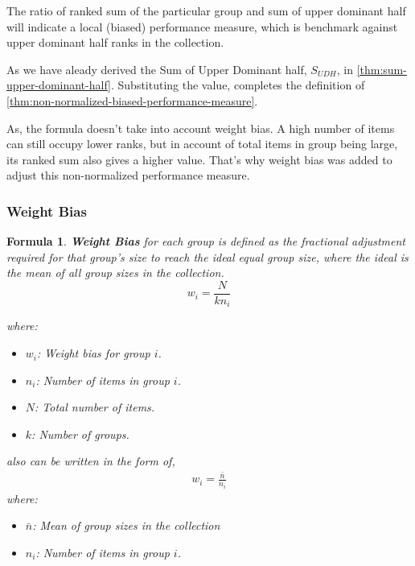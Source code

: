\documentclass[a4paper,fleqn,review]{cas-sc}
\newtheorem{theorem}{Formula}
\begin{document}
\begin{pot}[\ref{thm:non-normalized-biased-performance-measure}]
	The ratio of ranked sum of the particular group and sum of upper dominant half will indicate a local (biased) performance measure, which is benchmark against upper dominant half ranks in the collection. 
\end{pot}

As we have aleady derived the Sum of Upper Dominant half, $S_{UDH}$, in \autoref{thm:sum-upper-dominant-half}. Substituting the value, completes the definition of \autoref{thm:non-normalized-biased-performance-measure}.

As, the formula doesn't take into account weight bias. A high number of items can still occupy lower ranks, but in account of total items in group being large, its ranked sum also gives a higher value. That's why weight bias was added to adjust this non-normalized performance measure.

\subsubsection{Weight Bias}
\begin{theorem}\label{thm:weight-bias}
	\textbf{Weight Bias}
	 for each group is defined as the fractional adjustment required for that group’s size to reach the ideal equal group size, where the ideal is the mean of all group sizes in the collection.
	\begin{equation}
		w_i = \frac{N}{kn_i}
		\label{eq:weight-bias}
	\end{equation}
	
	where:
	\begin{itemize}
		\item[] $w_i$: Weight bias for group $i$.
		\item[] $n_i$: Number of items in group $i$.
		\item[] $N$: Total number of items.
		\item[] $k$: Number of groups.
	\end{itemize}
	also can be written in the form of,
	\begin{align*}
		w_i = \frac{\bar{n}}{n_i}
	\end{align*}
	where:
	\begin{itemize}
		\item[] $\bar{n}$: Mean of group sizes in the collection
		\item[] $n_i$: Number of items in group $i$.
	\end{itemize}
\end{theorem}
\end{document}
